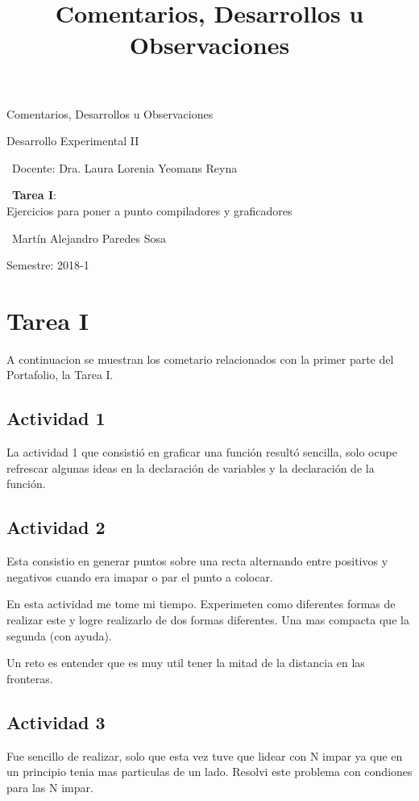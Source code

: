 \documentclass[12pt,letterpaper]{article}
\title{ Comentarios, Desarrollos u Observaciones  }
\begin{document}
\begin{titlepage}
	\centering
    \vspace*{2cm}
	{\Huge Comentarios, Desarrollos u Observaciones \par}
	\vfill
	{\Large Desarrollo Experimental II \par}
	\vfill
	{\large\ Docente: Dra. Laura Lorenia Yeomans Reyna \par}
    \vfill
    {\large\ \textbf{Tarea I}:\\ Ejercicios para poner a punto compiladores y graficadores \par}
    \vfill
    {\large\ Martín Alejandro Paredes Sosa \par}
	\vfill
	{\large Semestre: 2018-1\par}
\end{titlepage}
\section{Tarea I}
A continuacion se muestran  los cometario relacionados con la primer parte del Portafolio, la Tarea I.
\vspace{-0.5cm}

\subsection*{Actividad 1}
La actividad 1 que consistió en graficar una función resultó sencilla, solo ocupe refrescar algunas ideas en la declaración de variables y la declaración de la función.

\subsection*{Actividad 2}
Esta consistio en generar puntos sobre una recta alternando entre positivos y negativos cuando era imapar o par el punto a colocar.

En esta actividad me tome mi tiempo. Experimeten como diferentes formas de realizar este y logre realizarlo de dos formas diferentes. Una mas compacta que la segunda (con ayuda).

Un reto es entender que es muy util tener la mitad de la distancia en las fronteras.

\subsection*{Actividad 3}
Fue sencillo de realizar, solo que esta vez tuve que lidear con N impar ya que en un principio tenia mas particulas de un lado. Resolvi este problema con condiones para las N impar.
\end{document}
